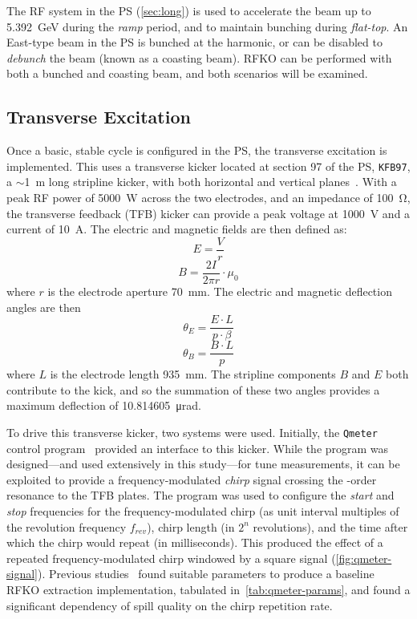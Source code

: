 \documentclass[a4paper,twoside,11pt]{report}
\begin{document}
The RF system in the PS (\autoref{sec:long}) is used to accelerate the beam up to \qty{5.392}{\giga\electronvolt} during the \textit{ramp} period, and to maintain bunching during \textit{flat-top}. An East-type beam in the PS is bunched at the  harmonic, or can be disabled to \textit{debunch} the beam (known as a coasting beam). RFKO can be performed with both a bunched and coasting beam, and both scenarios will be examined.

\subsection{Transverse Excitation}\label{sec:trans_exc}
Once a basic, stable cycle is configured in the PS, the transverse excitation is implemented. This uses a transverse kicker located at section 97 of the PS, \verb|KFB97|, a $\sim$\qty{1}{\meter} long stripline kicker, with both horizontal and vertical planes~\cite{Sterbini:2158994}. With a peak RF power of \qty{5000}{\watt} across the two electrodes, and an impedance of \qty{100}{\ohm}, the transverse feedback (TFB) kicker can provide a peak voltage at \qty{1000}{\volt} and a current of \qty{10}{\ampere}. The electric and magnetic fields are then defined as:
\begin{equation}
  E=\frac Vr
\end{equation}
\begin{equation}
  B=\frac {2I}{2\pi r}\cdot \mu_0
\end{equation}
where $r$ is the electrode aperture \qty{70}{\milli\meter}. The electric and magnetic deflection angles are then~\cite[3.1-3.2]{bouvet}
\begin{equation}
  \theta_E = \frac{E \cdot L}{p\cdot\beta}
  \label{eq:kick-electric}
\end{equation}
\begin{equation}
  \theta_B = \frac{B\cdot L}{p}
  \label{eq:kick-magnetic}
\end{equation} where $L$ is the electrode length \qty{935}{\milli\meter}. The stripline components $B$ and $E$ both contribute to the kick, and so the summation of these two angles provides a maximum deflection of \qty{10.814605}{\micro\radian}.

To drive this transverse kicker, two systems were used. Initially, the \verb|Qmeter| control program~\cite{Gasior:895142} provided an interface to this kicker. While the program was designed---and used extensively in this study---for tune measurements, it can be exploited to provide a frequency-modulated \textit{chirp} signal crossing the -order resonance to the TFB plates. The program was used to configure the \textit{start} and \textit{stop} frequencies for the frequency-modulated chirp (as unit interval multiples of the revolution frequency $f_{rev}$), chirp length (in $2^n$ revolutions), and the time after which the chirp would repeat (in milliseconds). This produced the effect of a repeated frequency-modulated chirp windowed by a square signal (\autoref{fig:qmeter-signal}). Previous studies~\cite{ipac} found suitable parameters to produce a baseline RFKO extraction implementation, tabulated in~\autoref{tab:qmeter-params}, and found a significant dependency of spill quality on the chirp repetition rate.
\end{document}
